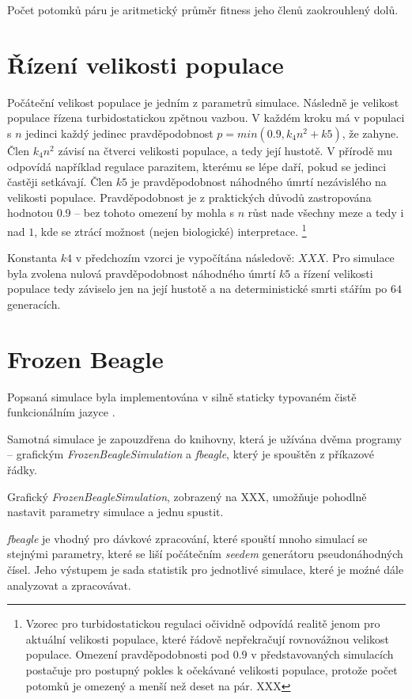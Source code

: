 Počet potomků páru je aritmetický průměr fitness jeho členů zaokrouhlený dolů.


\section{Řízení velikosti populace}

Počáteční velikost populace je jedním z parametrů simulace. Následně je velikost populace řízena turbidostatickou zpětnou vazbou. V každém kroku má v populaci s $n$ jedinci každý jedinec pravděpodobnost $p = min(0.9, k_4 n^2 + k5)$, že zahyne. Člen $k_4 n^2$ závisí na čtverci velikosti populace, a tedy její hustotě. V přírodě mu odpovídá například regulace parazitem, kterému se lépe daří, pokud se jedinci častěji setkávají. Člen $k5$ je pravděpodobnost náhodného úmrtí nezávislého na velikosti populace. Pravděpodobnost je z praktických důvodů zastropována hodnotou 0.9 -- bez tohoto omezení by mohla s $n$ růst nade všechny meze a tedy i nad $1$, kde se ztrácí možnost (nejen biologické) interpretace.
\footnote{Vzorec pro turbidostatickou regulaci očividně odpovídá realitě jenom pro aktuální velikosti populace, které řádově nepřekračují rovnovážnou velikost populace. Omezení pravděpodobnosti pod $0.9$ v představovaných simulacích postačuje pro postupný pokles k očekávané velikosti populace, protože počet potomků je omezený a menší než deset na pár. XXX}

Konstanta $k4$ v předchozím vzorci je vypočítána následově: $XXX$. Pro simulace byla zvolena nulová pravděpodobnost náhodného úmrtí $k5$ a řízení velikosti populace tedy záviselo jen na její hustotě a na deterministické smrti stářím po $64$ generacích.


\section{Frozen Beagle}

Popsaná simulace byla implementována v silně staticky typovaném čistě funkcionálním jazyce \cite{haskell}.

Samotná simulace je zapouzdřena do knihovny, která je užívána dvěma programy -- grafickým \textit{FrozenBeagleSimulation} a \textit{fbeagle}, který je spouštěn z příkazové řádky.

Grafický \textit{FrozenBeagleSimulation}, zobrazený na XXX, umožňuje pohodlně nastavit parametry simulace a jednu spustit.

\textit{fbeagle} je vhodný pro dávkové zpracování, které spouští mnoho simulací se stejnými parametry, které se liší počátečním \textit{seedem} generátoru pseudonáhodných čísel. Jeho výstupem je sada statistik pro jednotlivé simulace, které je moźné dále analyzovat a zpracovávat.

